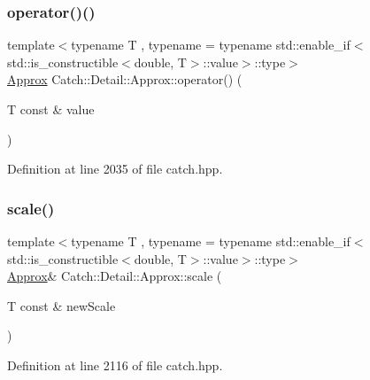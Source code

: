 \subsubsection{\texorpdfstring{operator()()}{operator()()}}
{\footnotesize\ttfamily template$<$typename T , typename  = typename std\+::enable\+\_\+if$<$std\+::is\+\_\+constructible$<$double, T$>$\+::value$>$\+::type$>$ \\
\mbox{\hyperlink{class_catch_1_1_detail_1_1_approx}{Approx}} Catch\+::\+Detail\+::\+Approx\+::operator() (\begin{DoxyParamCaption}\item[{T const \&}]{value }\end{DoxyParamCaption})\hspace{0.3cm}{\ttfamily [inline]}}



Definition at line 2035 of file catch.\+hpp.

\mbox{\label{class_catch_1_1_detail_1_1_approx_a8f4d2def2920a3840d3271f6d9c5ede2}} 
\subsubsection{\texorpdfstring{scale()}{scale()}}
{\footnotesize\ttfamily template$<$typename T , typename  = typename std\+::enable\+\_\+if$<$std\+::is\+\_\+constructible$<$double, T$>$\+::value$>$\+::type$>$ \\
\mbox{\hyperlink{class_catch_1_1_detail_1_1_approx}{Approx}}\& Catch\+::\+Detail\+::\+Approx\+::scale (\begin{DoxyParamCaption}\item[{T const \&}]{new\+Scale }\end{DoxyParamCaption})\hspace{0.3cm}{\ttfamily [inline]}}



Definition at line 2116 of file catch.\+hpp.

\mbox{\label{class_catch_1_1_detail_1_1_approx_a972fd9ac60607483263f1b0f0f9955e6}} 
